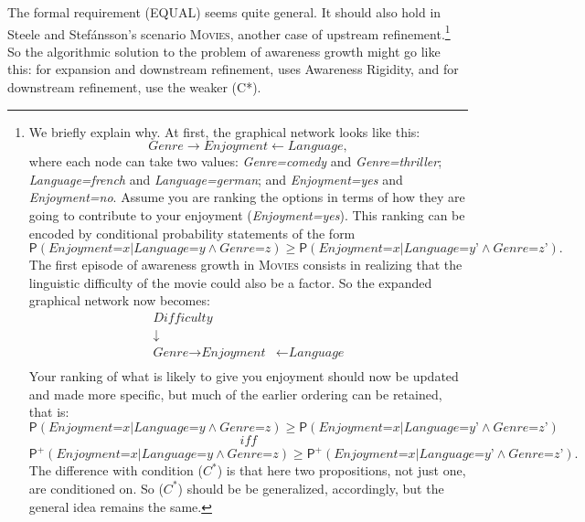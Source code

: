 \documentclass[
  11pt,
  dvipsnames,enabledeprecatedfontcommands]{scrartcl}
\newcommand{\pr}[1]{\ensuremath{\mathsf{P}(#1)}}
\newcommand{\ppr}[2]{\ensuremath{\mathsf{P}^{#1}(#2)}}
\begin{document}
The formal requirement (EQUAL) seems quite general. It should also hold
in Steele and Stefánsson's scenario \textsc{Movies}, another case of
upstream refinement.\footnote{We briefly explain why. At first, the
  graphical network looks like this:
  \[\textit{Genre} \rightarrow \textit{Enjoyment} \leftarrow \textit{Language},\]
  where each node can take two values: \textit{Genre=comedy} and
  \textit{Genre=thriller}; \textit{Language=french} and
  \textit{Language=german}; and \textit{Enjoyment=yes} and
  \textit{Enjoyment=no}. Assume you are ranking the options in terms of
  how they are going to contribute to your enjoyment
  (\textit{Enjoyment=yes}). This ranking can be encoded by conditional
  probability statements of the form
  \[\pr{\textit{Enjoyment=x} \vert \textit{Language=y} \wedge \textit{Genre=z}} \geq \pr{\textit{Enjoyment=x} \vert \textit{Language=y'} \wedge \textit{Genre=z'}}.\]
  The first episode of awareness growth in \textsc{Movies} consists in
  realizing that the linguistic difficulty of the movie could also be a
  factor. So the expanded graphical network now becomes: \begin{align*}
  \textit{Difficulty} &\\
  \downarrow \\
  \textit{Genre} \rightarrow \textit{Enjoyment} &\leftarrow \textit{Language}\\
  \end{align*} \noindent Your ranking of what is likely to give you
  enjoyment should now be updated and made more specific, but much of
  the earlier ordering can be retained, that is:
  \[\pr{\textit{Enjoyment=x} \vert \textit{Language=y} \wedge \textit{Genre=z}} \geq \pr{\textit{Enjoyment=x} \vert \textit{Language=y'} \wedge \textit{Genre=z'}}\]
  \[\textit{ iff }\]
  \[\ppr{+}{\textit{Enjoyment=x} \vert \textit{Language=y} \wedge \textit{Genre=z}} \geq \ppr{+}{\textit{Enjoyment=x} \vert \textit{Language=y'} \wedge \textit{Genre=z'}}.\]
  The difference with condition (\(C^*\)) is that here two propositions,
  not just one, are conditioned on. So (\(C^*\)) should be be
  generalized, accordingly, but the general idea remains the same.} So
the algorithmic solution to the problem of awareness growth might go
like this: for expansion and downstream refinement, uses Awareness
Rigidity, and for downstream refinement, use the weaker (C*).
\end{document}
